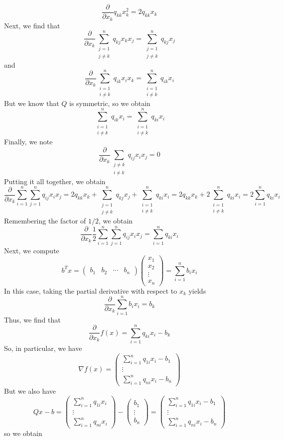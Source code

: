 \documentclass[12pt]{article}
\begin{document}
\[
\frac{\partial}{\partial x_k} q_{kk} x_k^2 = 2q_{kk} x_k
\] Next, we find that
\[
\frac{\partial}{\partial x_{k}}  \sum\limits_{\substack{j=1 \\ j \neq k }}^n q_{kj} x_{k} x_{j} = \sum\limits_{\substack{j=1 \\ j \neq k }}^n q_{kj} x_j
\] and
\[
\frac{\partial}{\partial x_{k}} \sum\limits_{\substack{i=1 \\ i\neq k }}^n q_{ik}x_{i}x_{k} = \sum\limits_{\substack{i=1 \\ i\neq k }}^n q_{ik}x_{i} 
\] But we know that $Q$ is symmetric, so we obtain
\[
\sum\limits_{\substack{i=1 \\ i\neq k }}^n q_{ik}x_{i}  = \sum\limits_{\substack{i=1 \\ i\neq k }}^n q_{ki}x_{i}
\] Finally, we note
\[
\frac{\partial}{\partial x_k}  \sum\limits_{\substack{j\neq k \\ i \neq k }} q_{ij}x_{i}x_{j} = 0
\] Putting it all together, we obtain
\[
\frac{\partial}{\partial x_k} \sum_{i=1}^n \sum_{j=1}^n q_{ij} x_i x_j  =  2q_{kk} x_k +  \sum\limits_{\substack{j=1 \\ j \neq k }}^n q_{kj} x_j +  \sum\limits_{\substack{i=1 \\ i\neq k }}^n q_{ki}x_{i}  = 2q_{kk}x_k + 2  \sum\limits_{\substack{i=1 \\ i\neq k }}^n q_{ki}x_{i} = 2 \sum_{i=1}^n q_{ki} x_i
\] Remembering the factor of $1/2$, we obtain
\[
\frac{\partial}{\partial x_k} \frac{1}{2} \sum_{i=1}^n \sum_{j=1}^n q_{ij} x_i x_j = \sum_{i=1}^n q_{ki} x_i
\] Next, we compute 
\[
b^T x =
\begin{pmatrix}
b_1 & b_2 & \cdots & b_n
\end{pmatrix} 
\begin{pmatrix}
x_1 \\ x_2 \\ \vdots \\ x_n
\end{pmatrix} = \sum_{i=1}^n b_i x_i
\] In this case, taking the partial derivative with respect to $x_k$ yields
\[
\frac{\partial}{\partial x_k} \sum_{i=1}^n b_i x_i = b_k
\] Thus, we find that
\[
\frac{\partial}{\partial x_k} f(x) =  \sum_{i=1}^n q_{ki} x_i - b_k
\] So, in particular, we have
\[
\nabla f(x) = \begin{pmatrix}
\sum_{i=1}^n q_{1i} x_i - b_1
\\
\vdots
\\
\sum_{i=1}^n q_{ni} x_i - b_n
\end{pmatrix}
\] But we also have
\[
Qx - b = \begin{pmatrix}
\sum_{i=1}^n q_{1i}x_i\\
\vdots\\
\sum_{i=1}^n q_{ni}x_i
\end{pmatrix} 
- \begin{pmatrix}
b_1\\
\vdots\\
b_n
\end{pmatrix} = \begin{pmatrix}
\sum_{i=1}^n q_{1i} x_i - b_1
\\
\vdots
\\
\sum_{i=1}^n q_{ni} x_i - b_n
\end{pmatrix}
\] so we obtain
\end{document}
